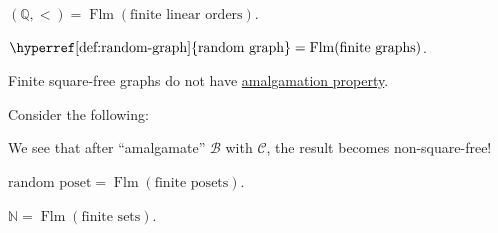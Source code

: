 \begin{eg}
	\((\mathbb{Q} , <)=\mathop{\mathrm{Flm}}(\text{finite linear orders})\).
\end{eg}

\begin{eg}
	\(\text{\hyperref[def:random-graph]{random graph}} = \mathop{\mathrm{Flm}}(\text{finite graphs}) \).
\end{eg}


\begin{eg}
	Finite square-free graphs do not have \hyperref[def:AP]{amalgamation property}.
\end{eg}
\begin{explanation}
	Consider the following:
	\begin{center}
	\end{center}
	We see that after ``amalgamate'' \(\mathcal{B} \) with \(\mathcal{C} \), the result becomes non-square-free!
\end{explanation}

\begin{eg}
	\(\text{random poset} = \mathop{\mathrm{Flm}}(\text{finite posets})\).
\end{eg}

\begin{eg}
	\(\mathbb{N} = \mathop{\mathrm{Flm}}(\text{finite sets})\).
\end{eg}


